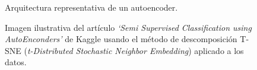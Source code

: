 \documentclass[
11pt, %
]{charter}
\begin{document}
\begin{figure}[H]
\centering
{}
\caption{Arquitectura representativa de un autoencoder.}
\label{fig:autoencoder}
\end{figure}

\begin{figure}[H]
\centering
{}
\hspace{0.05\textwidth}
\caption{Imagen ilustrativa del artículo \emph{‘Semi Supervised Classification using AutoEnconders’} de Kaggle usando el método de descomposición T-SNE (\emph{t-Distributed Stochastic Neighbor Embedding}) aplicado a los datos.}
\label{fig:latentRepresentation}
\end{figure}
\end{document}
